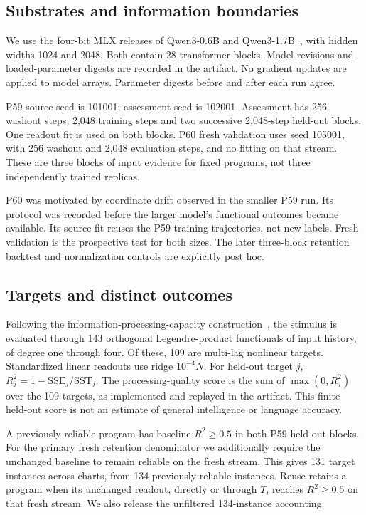\documentclass[11pt]{article}
\begin{document}
\subsection{Substrates and information boundaries}
We use the four-bit MLX releases of Qwen3-0.6B and Qwen3-1.7B~\cite{qwen}, with hidden widths 1024 and 2048. Both contain 28 transformer blocks. Model revisions and loaded-parameter digests are recorded in the artifact. No gradient updates are applied to model arrays. Parameter digests before and after each run agree.

P59 source seed is 101001; assessment seed is 102001. Assessment has 256 washout steps, 2,048 training steps and two successive 2,048-step held-out blocks. One readout fit is used on both blocks. P60 fresh validation uses seed 105001, with 256 washout and 2,048 evaluation steps, and no fitting on that stream. These are three blocks of input evidence for fixed programs, not three independently trained replicas.

P60 was motivated by coordinate drift observed in the smaller P59 run. Its protocol was recorded before the larger model's functional outcomes became available. Its source fit reuses the P59 training trajectories, not new labels. Fresh validation is the prospective test for both sizes. The later three-block retention backtest and normalization controls are explicitly post hoc.

\subsection{Targets and distinct outcomes}
Following the information-processing-capacity construction~\cite{dambre}, the stimulus is evaluated through 143 orthogonal Legendre-product functionals of input history, of degree one through four. Of these, 109 are multi-lag nonlinear targets. Standardized linear readouts use ridge $10^{-4}N$. For held-out target $j$, $R_j^2=1-\mathrm{SSE}_j/\mathrm{SST}_j$. The processing-quality score is the sum of $\max(0,R_j^2)$ over the 109 targets, as implemented and replayed in the artifact. This finite held-out score is not an estimate of general intelligence or language accuracy.

A previously reliable program has baseline $R^2\geq0.5$ in both P59 held-out blocks. For the primary fresh retention denominator we additionally require the unchanged baseline to remain reliable on the fresh stream. This gives 131 target instances across charts, from 134 previously reliable instances. Reuse retains a program when its unchanged readout, directly or through $T$, reaches $R^2\geq0.5$ on that fresh stream. We also release the unfiltered 134-instance accounting.
\end{document}
